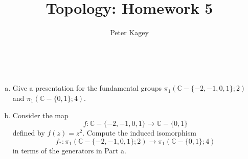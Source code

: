 \documentclass{article}
\newenvironment{problem}[2][Problem]{\begin{trivlist}
\item[\hskip \labelsep {\bfseries #1}\hskip \labelsep {\bfseries #2.}]}{\end{trivlist}}
\begin{document}
\title{Topology: Homework 5}
\author{Peter Kagey}

\maketitle

\begin{problem}{1} \text{} \\
  \begin{enumerate}[a.]
    \item Give a presentation for the fundamental groups
    $\pi_1(\mathbb C - \{-2, -1, 0, 1\}; 2)$ and
    $\pi_1(\mathbb C - \{ 0, 1\}; 4)$.
    \item Consider the map \[
      f\colon\mathbb C - \{-2, -1, 0, 1\}\rightarrow\mathbb C - \{ 0, 1\}
    \] defined by $f(z) = z^2$. Compute the induced isomorphism \[
      f_*\colon
      \pi_1(\mathbb C - \{-2, -1, 0, 1\}; 2) \rightarrow
      \pi_1(\mathbb C - \{ 0, 1\}; 4)
    \] in terms of the generators in Part a.
  \end{enumerate}
\end{problem}
\end{document}
